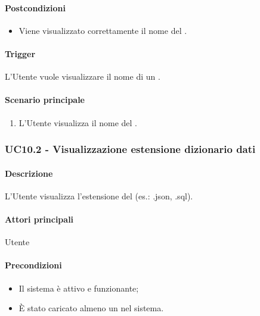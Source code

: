 \paragraph*{Postcondizioni}
\begin{itemize}
  \item Viene visualizzato correttamente il nome del .
\end{itemize}

\paragraph*{Trigger}
L'Utente vuole visualizzare il nome di un .

\paragraph*{Scenario principale}
\begin{enumerate}
  \item L'Utente visualizza il nome del .
\end{enumerate}


\subsubsection{UC10.2 - Visualizzazione estensione dizionario dati}\label{UC10point2}
\paragraph*{Descrizione}
L'Utente visualizza l'estensione del  (es.: .json, .sql).

\paragraph*{Attori principali}
Utente

\paragraph*{Precondizioni}
\begin{itemize}
  \item Il sistema è attivo e funzionante;
  \item È stato caricato almeno un  nel sistema. 
\end{itemize}


